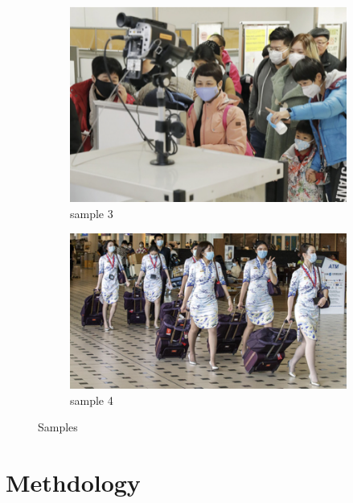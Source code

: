 \documentclass[10pt,a4paper]{report}
\begin{document}
\begin{figure}[hbtp]
\begin{subfigure}[b]{0.45\textwidth}
     \end{subfigure}
     \hfill
     \begin{subfigure}[b]{0.45\textwidth}
         \centering
         \includegraphics[width=\textwidth]{./imgs/maksssksksss149.png}
         \caption{sample 3}
         \label{fig:Gaussian blur image}
     \end{subfigure}
           \hfill
           \begin{subfigure}[b]{0.45\textwidth}
         \centering
         \includegraphics[width=\textwidth]{./imgs/maksssksksss752.png}
         \caption{sample 4}
         \label{fig:Gaussian blur image}
     \end{subfigure}
        \caption{Samples}
        \label{fig:Samples}
\end{figure}

\chapter{Methdology}
\end{document}
